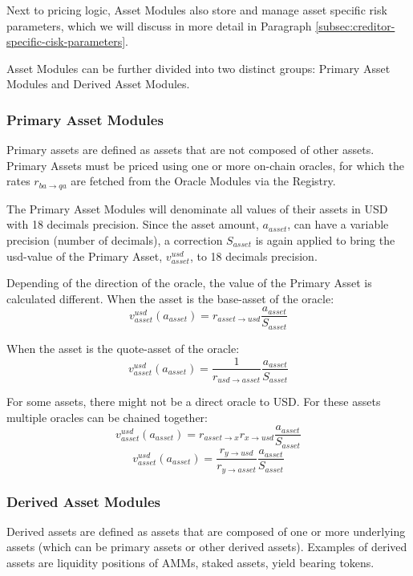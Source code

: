 \documentclass[sigconf,nonacm]{acmart}
\begin{document}
Next to pricing logic, Asset Modules also store and manage asset specific risk parameters, which we will discuss in more detail in Paragraph \ref{subsec:creditor-specific-cisk-parameters}.

Asset Modules can be further divided into two distinct groups: Primary Asset Modules and Derived Asset Modules.

\subsubsection{Primary Asset Modules}
Primary assets are defined as assets that are not composed of other assets.
Primary Assets must be priced using one or more on-chain oracles, for which the rates $r_{ba\rightarrow qa}$ are fetched from the Oracle Modules via the Registry.

The Primary Asset Modules will denominate all values of their assets in USD with 18 decimals precision.
Since the asset amount, $a_{asset}$, can have a variable precision (number of decimals),
a correction $S_{asset}$ is again applied to bring the usd-value of the Primary Asset, $v_{asset}^{usd}$, to 18 decimals precision.

Depending of the direction of the oracle, the value of the Primary Asset is calculated different.
When the asset is the base-asset of the oracle:
\begin{equation}
    v^{usd}_{asset}(a_{asset}) = r_{asset\rightarrow usd} \frac{a_{asset}}{S_{asset}}
\end{equation}

When the asset is the quote-asset of the oracle:
\begin{equation}
    v^{usd}_{asset}(a_{asset}) = \frac{1}{r_{usd\rightarrow asset}} \frac{a_{asset}}{S_{asset}}
\end{equation}

For some assets, there might not be a direct oracle to USD.
For these assets multiple oracles can be chained together:
\begin{equation}
    v^{usd}_{asset}(a_{asset}) = r_{asset\rightarrow x} r_{x\rightarrow usd} \frac{a_{asset}}{S_{asset}}
\end{equation}
\begin{equation}
    v^{usd}_{asset}(a_{asset}) = \frac{r_{y\rightarrow usd}}{r_{y\rightarrow asset}} \frac{a_{asset}}{S_{asset}}
\end{equation}

\subsubsection{Derived Asset Modules}
Derived assets are defined as assets that are composed of one or more underlying assets (which can be primary assets or other derived assets).
Examples of derived assets are liquidity positions of AMMs, staked assets, yield bearing tokens.
\end{document}
